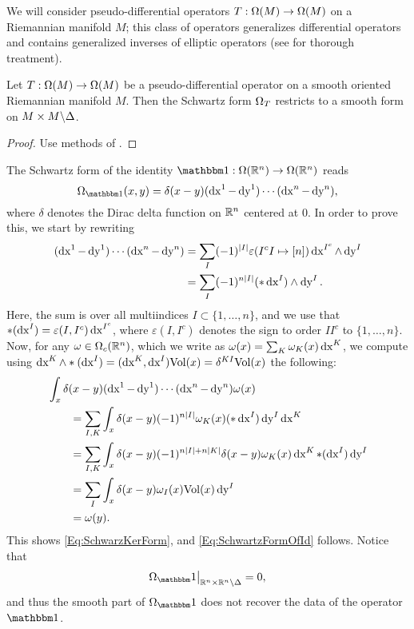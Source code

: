 \documentclass[\MainFolder/Text.tex]{subfiles}
\begin{document}
We will consider pseudo-differential operators $T:\Omega(M)\rightarrow\Omega(M)$ on a Riemannian manifold $M$; this class of operators generalizes differential operators and contains generalized inverses of elliptic operators (see \cite{Hormander} for thorough treatment).

\begin{Proposition} \label{Prop:ASD}
Let $T: \Omega(M) \rightarrow \Omega(M)$ be a pseudo-differential operator on a smooth oriented Riemannian manifold $M$. Then the Schwartz form $\Omega_{T}$ restricts to a smooth form on $M\times M\backslash\Delta$.
\end{Proposition}
\begin{proof}
Use methods of \cite{Hormander}.
\end{proof}
 
\begin{Example}\label{Ex:IdFE}The Schwartz form of the identity $\Id: \DR(\R^n)\rightarrow \DR(\R^n)$ reads
\begin{equation}\label{Eq:SchwartzFormOfId}
\DR_{\Id}(x,y) = \delta(x-y)(\Diff{x}^1 - \Diff{y}^1)\dotsb(\Diff{x}^n-\Diff{y}^n),
\end{equation}
where $\delta$ denotes the Dirac delta function on $\mathbb{R}^n$ centered at $0$. In order to prove this, we start by rewriting
\begin{align*}
(\operatorname{dx}^1 - \operatorname{dy}^1) \dotsb (\operatorname{dx}^n - \operatorname{dy}^n) &=\sum_{I}(-1)^{|I|} \varepsilon(I^c I \mapsto[n])\operatorname{dx}^{I^c} \wedge \operatorname{dy}^I \\
&=\sum_{I} (-1)^{n |I|} (* \operatorname{dx}^I) \wedge \operatorname{dy}^I.
\end{align*}
Here, the sum is over all multiindices $I\subset \{1,\dotsc,n\}$, and we use that $*(\operatorname{dx}^I) = \varepsilon(I, I^c) \operatorname{dx}^{I^c}$, where $\varepsilon(I,I^c)$ denotes the sign to order $I I^c$ to $\{1,\dotsc,n\}$. Now, for any $\omega\in \Omega_c(\mathbb{R}^n)$, which we write as $\omega(x) = \sum_K \omega_K(x)\operatorname{dx}^K$, we compute using $\operatorname{dx}^K\wedge*(\operatorname{dx}^I)=(\operatorname{dx}^K,\operatorname{dx}^I)\mathrm{Vol}(x) = \delta^{KI}\mathrm{Vol}(x)$ the following:
\begin{align*}
&\int_x \delta(x-y)  (\operatorname{dx}^1-\operatorname{dy}^1)\dotsb(\operatorname{dx}^n-\operatorname{dy}^n) \omega(x)  \\
&\qquad=\sum_{I,K} \int_x \delta(x-y)(-1)^{n|I|}  \omega_K(x)(* \operatorname{dx}^I)\operatorname{dy}^I\operatorname{dx}^K \\
&\qquad=\sum_{I,K}\int_x \delta(x-y) (-1)^{n|I| + n|K|} \delta(x-y)  \omega_K(x) \operatorname{dx}^K *(\operatorname{dx}^I) \operatorname{dy}^I \\
&\qquad=\sum_{I} \int_x \delta(x-y) \omega_I(x)\mathrm{Vol}(x) \operatorname{dy}^I \\
&\qquad=\omega(y).
\end{align*}
This shows \eqref{Eq:SchwarzKerForm}, and \eqref{Eq:SchwartzFormOfId} follows. Notice that
$$ \Restr{\DR_\Id}{\R^n\times \R^n\backslash \Diag} = 0, $$
and thus the smooth part of $\DR_\Id$ does not recover the data of the operator $\Id$.
\end{Example}
\end{document}
